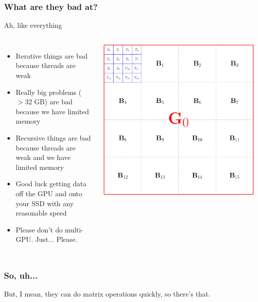 \documentclass{beamer}
\begin{document}
\begin{frame}
\frametitle{What are they bad at?}
\center Ah, like everything

\begin{columns}
\begin{itemize}
\item Iterative things are bad because threads are weak
\item Really big problems ($> 32$ GB) are bad because we have limited memory
\item Recursive things are bad because threads are weak and we have limited memory
\item Good luck getting data off the GPU and onto your SSD with any reasonable speed
\item Please don't do multi-GPU. Just... Please.
\end{itemize}
\begin{center}

\includegraphics[width=\textwidth]{gputhreads.png}
\end{center}
\end{columns}
\end{frame}

\begin{frame}
\frametitle{So, uh...}

But, I mean, they can do matrix operations quickly, so there's that.
\end{frame}
\end{document}
